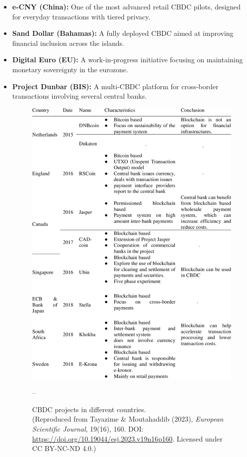 \begin{itemize}
    \item \textbf{e-CNY (China):} One of the most advanced retail CBDC pilots, designed for everyday transactions with tiered privacy.
    \item \textbf{Sand Dollar (Bahamas):} A fully deployed CBDC aimed at improving financial inclusion across the islands.
    \item \textbf{Digital Euro (EU):} A work-in-progress initiative focusing on maintaining monetary sovereignty in the eurozone.
    \item \textbf{Project Dunbar (BIS):} A multi-CBDC platform for cross-border transactions involving several central banks.

\begin{figure}[H]
    \centering
    \includegraphics[width=0.9\linewidth]{Figure/chp2/image.png}
 \caption{CBDC projects in different countries.\\
 (Reproduced from Tayazime \& Moutahaddib (2023), \textit{European Scientific Journal}, 19(16), 160. DOI: \url{https://doi.org/10.19044/esj.2023.v19n16p160}. Licensed under CC BY-NC-ND 4.0.)}
  --
    \label{fig:fig2}
\end{figure}


\end{itemize}
